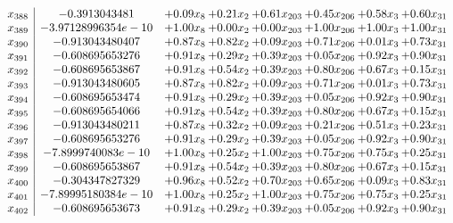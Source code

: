 \documentclass[8pt]{article}
\begin{document}
\[\begin{array}{c| c c@{\hskip 2pt} c@{\hskip 2pt} c@{\hskip 2pt} c@{\hskip 2pt} c@{\hskip 2pt} c@{\hskip 2pt} }
 x_{388}   &  -0.3913043481 & +  0.09 x_{8} & +  0.21 x_{2} & +  0.61 x_{203} & +  0.45 x_{206} & +  0.58 x_{3} & +  0.60 x_{31}\\
 x_{389}   &  -3.97128996354e-10 & +  1.00 x_{8} & +  0.00 x_{2} & +  0.00 x_{203} & +  1.00 x_{206} & +  1.00 x_{3} & +  1.00 x_{31}\\
 x_{390}   &  -0.913043480407 & +  0.87 x_{8} & +  0.82 x_{2} & +  0.09 x_{203} & +  0.71 x_{206} & +  0.01 x_{3} & +  0.73 x_{31}\\
 x_{391}   &  -0.608695653276 & +  0.91 x_{8} & +  0.29 x_{2} & +  0.39 x_{203} & +  0.05 x_{206} & +  0.92 x_{3} & +  0.90 x_{31}\\
 x_{392}   &  -0.608695653867 & +  0.91 x_{8} & +  0.54 x_{2} & +  0.39 x_{203} & +  0.80 x_{206} & +  0.67 x_{3} & +  0.15 x_{31}\\
 x_{393}   &  -0.913043480605 & +  0.87 x_{8} & +  0.82 x_{2} & +  0.09 x_{203} & +  0.71 x_{206} & +  0.01 x_{3} & +  0.73 x_{31}\\
 x_{394}   &  -0.608695653474 & +  0.91 x_{8} & +  0.29 x_{2} & +  0.39 x_{203} & +  0.05 x_{206} & +  0.92 x_{3} & +  0.90 x_{31}\\
 x_{395}   &  -0.608695654066 & +  0.91 x_{8} & +  0.54 x_{2} & +  0.39 x_{203} & +  0.80 x_{206} & +  0.67 x_{3} & +  0.15 x_{31}\\
 x_{396}   &  -0.913043480211 & +  0.87 x_{8} & +  0.32 x_{2} & +  0.09 x_{203} & +  0.21 x_{206} & +  0.51 x_{3} & +  0.23 x_{31}\\
 x_{397}   &  -0.608695653276 & +  0.91 x_{8} & +  0.29 x_{2} & +  0.39 x_{203} & +  0.05 x_{206} & +  0.92 x_{3} & +  0.90 x_{31}\\
 x_{398}   &  -7.8999740083e-10 & +  1.00 x_{8} & +  0.25 x_{2} & +  1.00 x_{203} & +  0.75 x_{206} & +  0.75 x_{3} & +  0.25 x_{31}\\
 x_{399}   &  -0.608695653867 & +  0.91 x_{8} & +  0.54 x_{2} & +  0.39 x_{203} & +  0.80 x_{206} & +  0.67 x_{3} & +  0.15 x_{31}\\
 x_{400}   &  -0.304347827329 & +  0.96 x_{8} & +  0.52 x_{2} & +  0.70 x_{203} & +  0.65 x_{206} & +  0.09 x_{3} & +  0.83 x_{31}\\
 x_{401}   &  -7.89995180384e-10 & +  1.00 x_{8} & +  0.25 x_{2} & +  1.00 x_{203} & +  0.75 x_{206} & +  0.75 x_{3} & +  0.25 x_{31}\\
 x_{402}   &  -0.608695653673 & +  0.91 x_{8} & +  0.29 x_{2} & +  0.39 x_{203} & +  0.05 x_{206} & +  0.92 x_{3} & +  0.90 x_{31}\\

\end{array}\]
\end{document}
